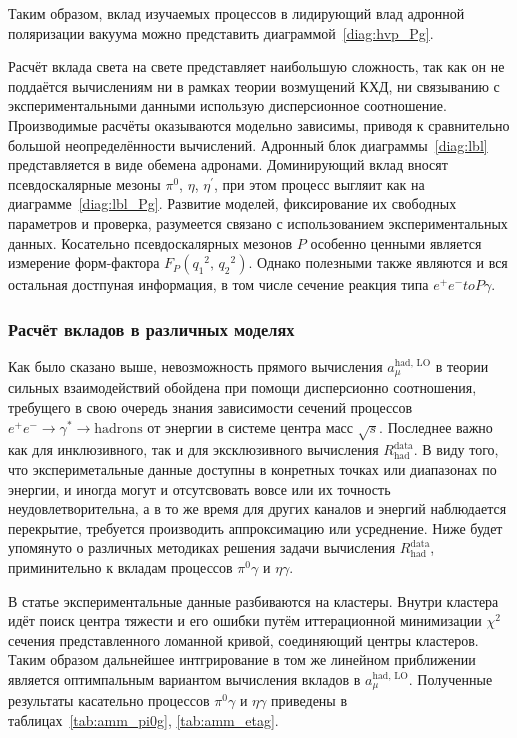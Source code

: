 Таким образом,
вклад изучаемых процессов в лидирующий влад адронной поляризации вакуума можно представить диаграммой~\ref{diag:hvp_Pg}.

Расчёт вклада света на свете представляет наибольшую сложность,
так как он не поддаётся вычислениям ни в рамках теории возмущений КХД,
ни связыванию с экспериментальными данными использую дисперсионное соотношение.
Производимые расчёты оказываются модельно зависимы,
приводя к сравнительно большой неопределённости вычислений.
Адронный блок диаграммы~\ref{diag:lbl} представляется в виде обемена адронами.
Доминирующий вклад вносят псевдоскалярные мезоны $\pi^0$, $\eta$, $\eta^\prime$,
при этом процесс выгляит как на диаграмме~\ref{diag:lbl_Pg}.
Развитие моделей,
фиксирование их свободных параметров и проверка,
разумеется связано с использованием экспериментальных данных.
Косательно псевдоскалярных мезонов $P$ особенно ценными является измерение форм-фактора
$F_P ( {q_1}^2, \, {q_2}^2 )$.
Однако полезными также являются и вся остальная достпуная информация,
в том числе сечение реакция типа $e^+ e^- to P \gamma$.


\subsubsection{Расчёт вкладов в различных моделях}
\label{contribution-calculation}


Как было сказано выше,
невозможность прямого вычисления $a_\mu^{\text{had, LO}}$
в теории сильных взаимодействий обойдена при помощи дисперсионно соотношения,
требущего в свою очередь знания зависимости сечений процессов
$e^+ e^- \to \gamma^* \to \text{hadrons}$
от энергии в системе центра масс $\sqrt{s}$.
Последнее важно как для инклюзивного,
так и для эксклюзивного вычисления $R_{\text{had}}^{\text{data}}$.
В виду того,
что экспериметальные данные доступны в конретных точках или диапазонах по энергии,
и иногда могут и отсутсвовать вовсе или их точность неудовлетворительна,
а в то же время для других каналов и энергий наблюдается перекрытие,
требуется производить аппроксимацию или усреднение.
Ниже будет упомянуто о различных методиках решения задачи вычисления $R_{\text{had}}^{\text{data}}$,
приминительно к вкладам процессов $\pi^0 \gamma$ и $\eta \gamma$.


В статье \cite{KNT18} экспериментальные данные разбиваются на кластеры.
Внутри кластера идёт поиск центра тяжести и его ошибки путём иттерационной минимизации $\chi^2$ сечения
представленного ломанной кривой, соединяющий центры кластеров.
Таким образом дальнейшее интгрирование в том же линейном приближении является оптимпальным вариантом вычисления вкладов в $a_\mu^{\text{had, LO}}$.
Полученные результаты касательно процессов $\pi^0 \gamma$ и $\eta \gamma$ приведены в таблицах~\ref{tab:amm_pi0g}, \ref{tab:amm_etag}.

